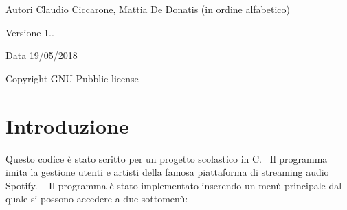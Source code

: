 \begin{DoxyAuthor}{Autori}
Claudio Ciccarone, Mattia De Donatis (in ordine alfabetico) 
\end{DoxyAuthor}
\begin{DoxyVersion}{Versione}
1.. 
\end{DoxyVersion}
\begin{DoxyDate}{Data}
19/05/2018 
\end{DoxyDate}
\begin{DoxyCopyright}{Copyright}
G\+NU Pubblic license
\end{DoxyCopyright}
\hypertarget{index_intro_sec}{}\section{Introduzione}\label{index_intro_sec}
Questo codice è stato scritto per un progetto scolastico in C.~\newline
 Il programma imita la gestione utenti e artisti della famosa piattaforma di streaming audio Spotify.~\newline
 -\/\+Il programma è stato implementato inserendo un menù principale dal quale si possono accedere a due sottomenù\+:
